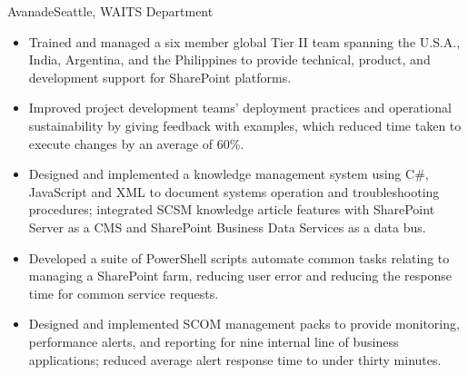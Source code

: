 \documentclass[11pt,letter,roman]{moderncv}
\begin{document}
{Avanade}{Seattle, WA}{ITS Department}{%
  \begin{itemize}
    \item Trained and managed a six member global Tier II team spanning the
      U.S.A., India, Argentina, and the Philippines to provide technical,
      product, and development support for SharePoint platforms.
    \item Improved project development teams' deployment practices and
      operational sustainability by giving feedback with examples, which
      reduced time taken to execute changes by an average of 60\%.
    \item Designed and implemented a knowledge management system using C\#,
      JavaScript and XML to document systems operation and troubleshooting
      procedures; integrated SCSM knowledge article features with SharePoint
      Server as a CMS and SharePoint Business Data Services as a data bus.
    \item Developed a suite of PowerShell scripts automate common tasks
      relating to managing a SharePoint farm, reducing user error and reducing
      the response time for common service requests.
    \item Designed and implemented SCOM management packs to provide monitoring,
      performance alerts, and reporting for nine internal line of business
      applications; reduced average alert response time to under thirty
      minutes.
  \end{itemize}
}
\end{document}

